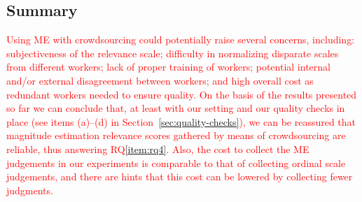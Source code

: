 

\subsection{Summary}
\label{sec:summary-1}

\textcolor{red}{ 
Using ME with crowdsourcing could potentially raise
several concerns, including: 
subjectiveness of the relevance scale; 
difficulty in normalizing disparate scales from different workers; 
lack of proper training of workers;
potential internal and/or external disagreement between workers;
and high overall cost as redundant workers needed to ensure quality.
On the basis of the results presented so far we can conclude that, at
least with our setting and our quality checks in place (see items
(a)--(d) in Section~\ref{sec:quality-checks}), we can be reassured that
magnitude estimation relevance scores gathered by means of
crowdsourcing are reliable, thus answering RQ\ref{item:rq4}.
Also, the cost to collect the ME judgements in our experiments 
is comparable to that of collecting ordinal scale judgements, 
and there are hints that this cost can be lowered by collecting fewer judgments.
} 

